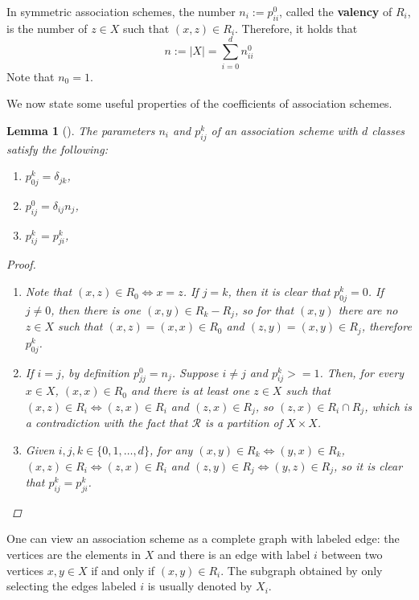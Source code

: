 \documentclass[a4paper,12pt]{article}
\theoremstyle{plain}
\newtheorem{lemma}[theorem]{Lemma}
\theoremstyle{definition}
\theoremstyle{remark}
\begin{document}
In symmetric association schemes, the number $ n_i := p_{ii}^0 $, called the
\textbf{valency} of $ R_i $, is the number of $ z \in X $ such that
$ (x,z) \in R_i $. Therefore, it holds that
\[ n := \mid X \mid = \sum_{ i=0 }^{ d } n_{ii}^0 \]
Note that $ n_0 = 1 $.

We now state some useful properties of the coefficients of association schemes.
\begin{lemma}[{\parencite[Lemma 2.1.1]{brouwer_distance-regular_1989}}]
    The parameters $ n_i$ and $ p_{ij}^k $ of an association scheme with $ d $
    classes satisfy the following:
    \begin{enumerate}[label=(\roman*)]
        \item $ p_{0j}^k = \delta_{jk} $,
        \item $ p_{ij}^0 = \delta_{ij}n_j $,
        \item $ p_{ij}^k = p_{ji}^k $,
    \end{enumerate}
    \begin{proof}
        \begin{enumerate}[label=(\roman*)]
        \item Note that $ (x,z) \in R_0 \iff x = z $. If $ j = k $, then it is
            clear that $ p_{0j}^k = 0 $. If $ j \neq 0 $, then there is one
            $ (x,y) \in R_k - R_j $, so for that $ (x,y) $ there are no $ z\in X $
            such that $ (x,z) = (x,x) \in R_0 $ and $ (z,y) = (x,y) \in R_j $,
            therefore $ p_{0j}^k $.
        \item If $ i = j $, by definition $ p_{jj}^0 = n_j $. Suppose
            $ i \neq j $ and $ p_{ij}^k >= 1 $. Then, for every $ x \in X $,
            $ (x,x) \in R_0 $ and there is at least one $ z \in X $ such that
            $ (x,z) \in R_i \iff (z, x) \in R_i $ and $ (z,x) \in R_j $, so
            $ (z,x) \in R_i \cap R_j $, which is a contradiction with the fact
            that $ \mathcal{R} $ is a partition of $ X \times X $.
        \item Given $ i,j,k \in \{ 0,1,\dots,d \} $, for any $ (x,y) \in R_k
            \iff (y,x) \in R_k $,
            $ (x,z) \in R_i \iff (z,x) \in R_i $ and $ (z,y) \in R_j \iff
            (y,z) \in R_j$, so it is clear that $ p_{ij}^k = p_{ji}^k $.
             \end{enumerate}
    \end{proof}

\end{lemma}

One can view an association scheme as a complete graph with labeled edge:
the vertices are the elements in $ X $ and there is an edge with label $ i $
between two vertices $ x,y \in X $ if and only if $ (x,y) \in R_i $. The subgraph
obtained by only selecting the edges labeled $ i $ is usually denoted by
$ X_i $.
\end{document}
